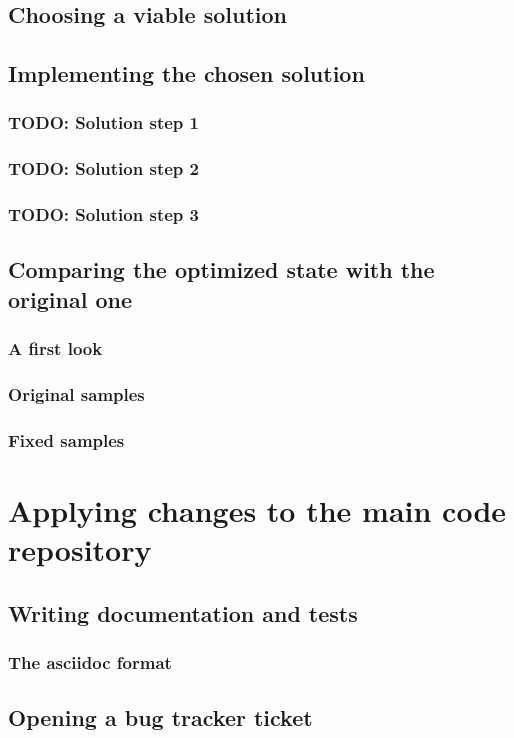 \documentclass[11pt,a4paper,oneside]{report}
\begin{document}
\section{Choosing a viable solution}
\section{Implementing the chosen solution}
\subsection{TODO: Solution step 1}
\subsection{TODO: Solution step 2}
\subsection{TODO: Solution step 3}
\section{Comparing the optimized state with the original one}
\subsection{A first look}
\subsection{Original samples}
\subsection{Fixed samples}

\chapter{Applying changes to the main code repository}
\section{Writing documentation and tests}
\subsection{The asciidoc format}
\section{Opening a bug tracker ticket}
\end{document}
